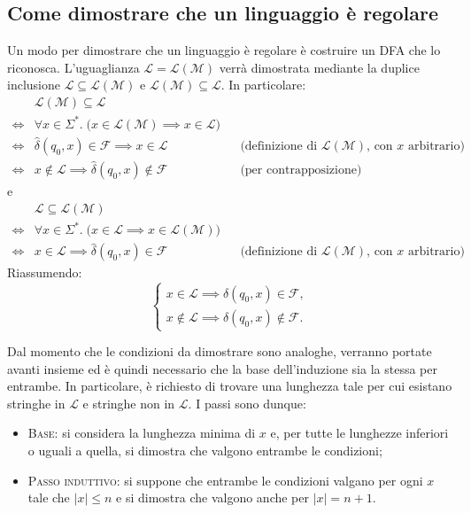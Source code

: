 \documentclass[a4paper, 11pt, oneside]{book}
\theoremstyle{formale}
\begin{document}
    \subsection{Come dimostrare che un linguaggio \`e regolare}
    \label{sec:dimostrare-regolare}
    Un modo per dimostrare che un linguaggio \`e regolare \`e costruire un DFA che lo
    riconosca. L'uguaglianza $\mathcal{L} = \mathcal{L}(\mathcal{M})$ verr\`a dimostrata
    mediante la duplice inclusione $\mathcal{L} \subseteq \mathcal{L}(\mathcal{M})$ e
    $\mathcal{L}(\mathcal{M}) \subseteq \mathcal{L}$. In particolare:
    \begin{align*}
        & \mathcal{L}(\mathcal{M}) \subseteq \mathcal{L} \\
        \iff {} & \forall x \in \Sigma^*.\;
            \bigl(x \in \mathcal{L}(\mathcal{M}) \implies x \in \mathcal{L}\bigr) \\
        \iff {} & \hat{\delta}(q_0, x) \in \mathcal{F} \implies x \in \mathcal{L}
            && \text{(definizione di $\mathcal{L}(\mathcal{M})$, con $x$ arbitrario)} \\
        \iff {} & x \notin \mathcal{L} \implies \hat{\delta}(q_0, x) \notin \mathcal{F}
            && \text{(per contrapposizione)}
    \end{align*}
    e
    \begin{align*}
        & \mathcal{L} \subseteq \mathcal{L}(\mathcal{M}) \\
        \iff {} & \forall x \in \Sigma^*.\;
            \bigl(x \in \mathcal{L} \implies x \in \mathcal{L}(\mathcal{M})\bigr) \\
        \iff {} & x \in \mathcal{L} \implies \hat{\delta}(q_0, x) \in \mathcal{F}
            && \text{(definizione di $\mathcal{L}(\mathcal{M})$, con $x$ arbitrario)}
    \end{align*}
    Riassumendo:
    \begin{equation*}
        \begin{cases}
            x \in \mathcal{L} \implies \hat{\delta}(q_0, x) \in \mathcal{F}, \\
            x \notin \mathcal{L} \implies \hat{\delta}(q_0, x) \notin \mathcal{F}.
        \end{cases}
    \end{equation*}

    Dal momento che le condizioni da dimostrare sono analoghe, verranno portate avanti
    insieme ed \`e quindi necessario che la base dell'induzione sia la stessa per entrambe.
    In particolare, \`e richiesto di trovare una lunghezza tale per cui esistano stringhe in
    $\mathcal{L}$ e stringhe non in $\mathcal{L}$. I passi sono dunque:
    \begin{itemize}
        \item \textsc{Base}: si considera la lunghezza minima di $x$ e, per tutte le
            lunghezze inferiori o uguali a quella, si dimostra che valgono entrambe le
            condizioni;
        \item \textsc{Passo induttivo}: si suppone che entrambe le condizioni valgano per
            ogni $x$ tale che $|x| \leq n$ e si dimostra che valgono anche per
            $|x| = n + 1$.
    \end{itemize}
\end{document}
